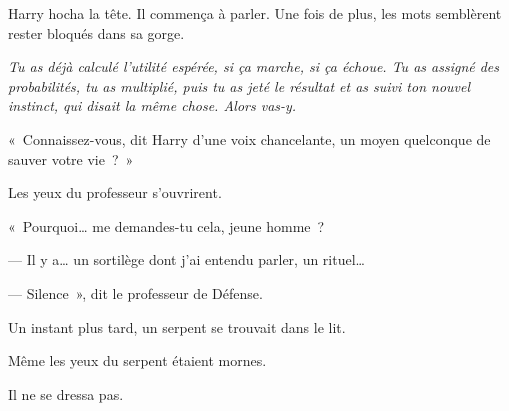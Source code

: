 Harry hocha la tête.
Il commença à parler.
Une fois de plus, les mots semblèrent rester bloqués dans sa gorge.

\emph{Tu as déjà calculé l'utilité espérée, si ça marche, si ça échoue.
Tu as assigné des probabilités, tu as multiplié, puis tu as jeté le résultat et as suivi ton nouvel instinct, qui disait la même chose.
Alors vas-y.}

«~Connaissez-vous, dit Harry d'une voix chancelante, un moyen quelconque de sauver votre vie~?~»

Les yeux du professeur s'ouvrirent.

«~Pourquoi… me demandes-tu cela, jeune homme~?

--- Il y a… un sortilège dont j'ai entendu parler, un rituel…

--- Silence~», dit le professeur de Défense.

Un instant plus tard, un serpent se trouvait dans le lit.

Même les yeux du serpent étaient mornes.

Il ne se dressa pas.

